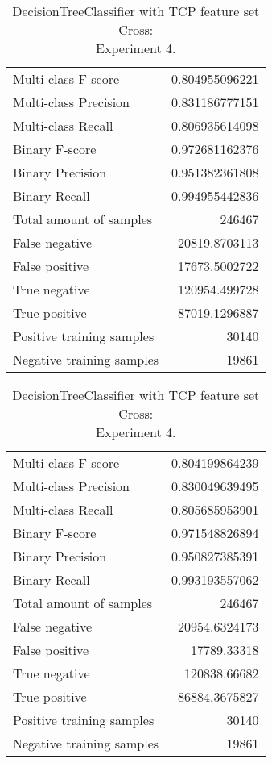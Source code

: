 \begin{table}[H]
\begin{minipage}{0.5\textwidth}
\caption{DecisionTreeClassifier with TCP feature set Cross: \\Experiment 3.}
\centering
\begin{tabular}{l r}
\toprule
Multi-class F-score & 0.804955096221 \\
Multi-class Precision & 0.831186777151 \\
Multi-class Recall & 0.806935614098 \\
\midrule
Binary F-score & 0.972681162376 \\
Binary Precision & 0.951382361808 \\
Binary Recall & 0.994955442836 \\
\midrule
Total amount of samples & 246467 \\
False negative & 20819.8703113 \\
False positive & 17673.5002722 \\
True negative & 120954.499728 \\
True positive & 87019.1296887 \\
\midrule
Positive training samples & 30140 \\
Negative training samples & 19861 \\
\bottomrule
\end{tabular}
\end{minipage}
\hfillx
\begin{minipage}{0.5\textwidth}
\caption{DecisionTreeClassifier with TCP feature set Cross: \\Experiment 4.}
\centering
\begin{tabular}{l r}
\toprule
Multi-class F-score & 0.804199864239 \\
Multi-class Precision & 0.830049639495 \\
Multi-class Recall & 0.805685953901 \\
\midrule
Binary F-score & 0.971548826894 \\
Binary Precision & 0.950827385391 \\
Binary Recall & 0.993193557062 \\
\midrule
Total amount of samples & 246467 \\
False negative & 20954.6324173 \\
False positive & 17789.33318 \\
True negative & 120838.66682 \\
True positive & 86884.3675827 \\
\midrule
Positive training samples & 30140 \\
Negative training samples & 19861 \\
\bottomrule
\end{tabular}
\end{minipage}
\end{table}
